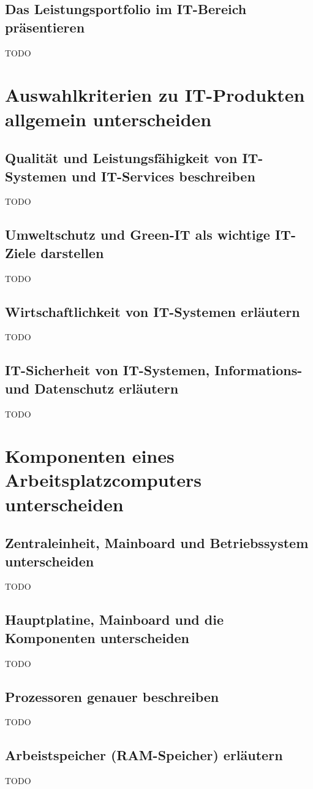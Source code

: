 \documentclass[11pt]{article}
\begin{document}
\subsection{Das Leistungsportfolio im IT-Bereich präsentieren}
    TODO

\newpage
\section{Auswahlkriterien zu IT-Produkten allgemein unterscheiden}
\subsection{Qualität und Leistungsfähigkeit von IT-Systemen und IT-Services beschreiben}
    TODO
\subsection{Umweltschutz und Green-IT als wichtige IT-Ziele darstellen}
    TODO
\subsection{Wirtschaftlichkeit von IT-Systemen erläutern}
    TODO
\subsection{IT-Sicherheit von IT-Systemen, Informations- und Datenschutz erläutern}
    TODO

\newpage
\section{Komponenten eines Arbeitsplatzcomputers unterscheiden}
\subsection{Zentraleinheit, Mainboard und Betriebssystem unterscheiden}
    TODO
\subsection{Hauptplatine, Mainboard und die Komponenten unterscheiden}
    TODO
\subsection{Prozessoren genauer beschreiben}
    TODO
\subsection{Arbeistspeicher (RAM-Speicher) erläutern}
    TODO
\end{document}
